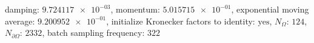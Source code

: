 damping: $\num[scientific-notation=true]{9.724117e-03}$, momentum: $\num[scientific-notation=true]{5.015715e-01}$, exponential moving average: $\num[scientific-notation=true]{9.200952e-01}$, initialize Kronecker factors to identity: $\text{yes}$, $N_{\Omega}$: $\num[scientific-notation=false]{124}$, $N_{\partial\Omega}$: $\num[scientific-notation=false]{2332}$, batch sampling frequency: $\num[scientific-notation=false]{322}$